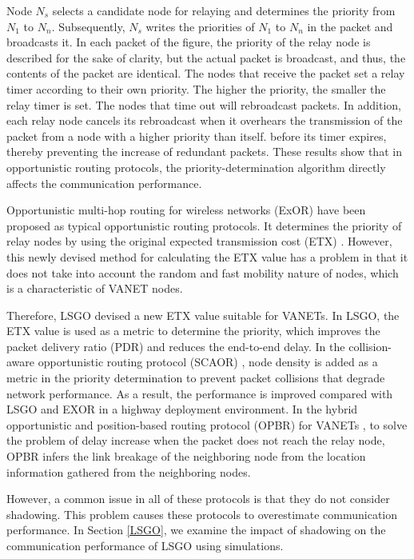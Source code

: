 \documentclass[conference]{IEEEtran}
\begin{document}
Node $N_{s}$ selects a candidate node for relaying and determines the priority from $N_{1}$ to $N_{n}$. Subsequently, $N_{s}$ writes the priorities of $N_{1}$ to $N_{n}$ in the packet and broadcasts it. 
In each packet of the figure, the priority of the relay node is described for the sake of clarity, but the actual packet is broadcast, and thus, the contents of the packet are identical. 
The nodes that receive the packet set a relay timer according to their own priority.
The higher the priority, the smaller the relay timer is set.
The nodes that time out will rebroadcast packets.
In addition, each relay node cancels its rebroadcast when it overhears the transmission of the packet from a node with a higher priority than itself.
before its timer expires, thereby preventing the increase of redundant packets.
These results show that in opportunistic routing protocols, the priority-determination algorithm directly affects  the communication performance.


Opportunistic multi-hop routing for wireless
networks (ExOR) \cite{16} have been proposed as typical opportunistic routing protocols. It determines the priority of relay nodes by using the original expected transmission cost (ETX) \cite{21}. However, this newly devised method for calculating the ETX value has a problem in that it does not take into account the random and fast mobility nature of nodes, which is a characteristic of VANET nodes.\par


Therefore, LSGO devised a new ETX value suitable for VANETs. In LSGO, the ETX value is used as a metric to determine the priority, which improves the packet delivery ratio (PDR) and reduces the end-to-end delay.
In the collision-aware opportunistic routing protocol (SCAOR) \cite{22}, node density is added as a metric in the priority determination to prevent packet collisions that degrade network performance. 
As a result, the performance is improved compared with LSGO and EXOR in a highway deployment environment. 
In the hybrid opportunistic and position-based routing protocol (OPBR) for VANETs
\cite{23}, to solve the problem of delay increase when the packet does not reach the relay node, OPBR infers the link breakage of the neighboring node from the location information gathered from the neighboring nodes.

However, a  common issue in all of these protocols is that they do not consider shadowing.
This problem causes these protocols to overestimate communication performance. In Section \ref{LSGO}, we examine the impact of shadowing on the communication performance of LSGO using simulations. 
\end{document}
